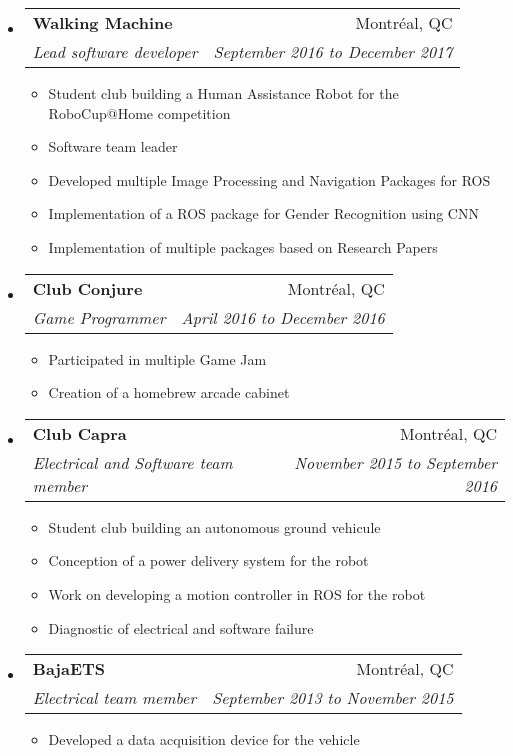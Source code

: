 \documentclass[letterpaper,11pt]{article}
\makeatletter
\newcommand{\ressubheading}[4]{
	\begin{tabular*}{6.5in}{l@{\cftdotfill{\cftsecdotsep}\extracolsep{\fill}}r}
		\textbf{#1} & #2 \\
		\textit{#3} & \textit{#4} \\
	\end{tabular*}\vspace{-6pt}}
\makeatother
\begin{document}
	\begin{itemize}
		\item 
			\ressubheading{Walking Machine}{Montréal, QC}{Lead software developer}{September 2016 to December 2017}
			\begin{itemize}
				\item Student club building a Human Assistance Robot for the RoboCup@Home competition
				\item Software team leader
				\item Developed multiple Image Processing and Navigation Packages for ROS
				\item Implementation of a ROS package for Gender Recognition using CNN
				\item Implementation of multiple packages based on Research Papers
			\end{itemize}
			
		\item
			\ressubheading{Club Conjure}{Montréal, QC}{Game Programmer}{April 2016 to December 2016}
			\begin{itemize}
				\item Participated in multiple Game Jam
				\item Creation of a homebrew arcade cabinet
			\end{itemize}
		\item
			\ressubheading{Club Capra}{Montréal, QC}{Electrical and Software team member}{November 2015 to September 2016}
			\begin{itemize}
				\item Student club building an autonomous ground vehicule
				\item Conception of a power delivery system for the robot
				\item Work on developing a motion controller in ROS for the robot
				\item Diagnostic of electrical and software failure
			\end{itemize}

		\item
			\ressubheading{BajaETS}{Montréal, QC}{Electrical team member}{September 2013 to November 2015}
			\begin{itemize}
				\item Developed a data acquisition device for the vehicle
			\end{itemize}

	\end{itemize}
	
	
\end{document}
